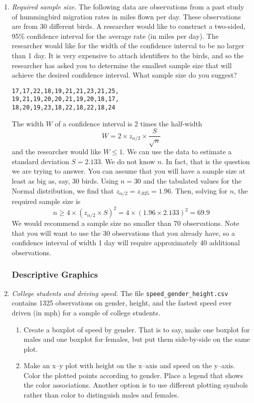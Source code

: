 \begin{enumerate}
\item \emph{Required sample size.} The following data are observations
  from a past study of hummingbird migration rates in miles flown per
  day. These observations are from 30 different birds. A researcher
  would like to construct a two-sided, 95\% confidence interval for
  the average rate (in miles per day). The researcher would like for
  the width of the confidence interval to be no larger than 1 day. It
  is very expensive to attach identifiers to the birds, and so the
  researcher has asked you to determine the smallest sample size that
  will achieve the desired confidence interval. What sample size do
  you suggest?
\begin{Verbatim}[samepage=true]
17,17,22,18,19,21,21,23,21,25,
19,21,19,20,20,21,19,20,18,17,
18,20,19,23,18,22,18,22,18,24
\end{Verbatim}

\begin{solution}
\bs The width $W$ of a confidence interval is
2 times the half-width
\[
W = 2 \times z_{\alpha/2} \times \frac{S}{\sqrt{n}}
\]
and the researcher would like $W\leq 1$. We can use the data to
estimate a standard deviation $S = 2.133$. We do not know $n$. In
fact, that is the question we are trying to answer. You can assume
that you will have a sample size at least as big as, say, 30
birds. Using $n=30$ and the tabulated values for the Normal
distribution, we find that $z_{\alpha/2} = z_{.025} = 1.96$.  Then,
solving for $n$, the required sample size is
\[
n \geq 4 \times (z_{\alpha/2} \times S)^2 = 
4 \times (1.96 \times 2.133)^2 = 69.9
\]
We would recommend a sample size no smaller than 70 observations.
Note that you will want to use the 30 observations that you already
have, so a confidence interval of width 1 day will require 
approximately 40 additional observations.
\end{solution}

\subsubsection*{Descriptive Graphics}

\item \emph{College students and driving speed.} The file
  \texttt{speed\_gender\_height.csv} contains \num{1325} observations on
  gender, height, and the fastest speed ever driven (in mph) for a
  sample of college students.

\begin{enumerate}
\item Create a boxplot of speed by gender. That is to say, make one
  boxplot for males and one boxplot for females, but put them
  side-by-side on the same plot.
\item Make an x--y plot with height on the x--axis and speed on the
  y--axis. Color the plotted points according to gender. Place a
  legend that shows the color associations. Another option is to use
  different plotting symbols rather than color to distinguish males
  and females.
\end{enumerate}

\end{enumerate}
